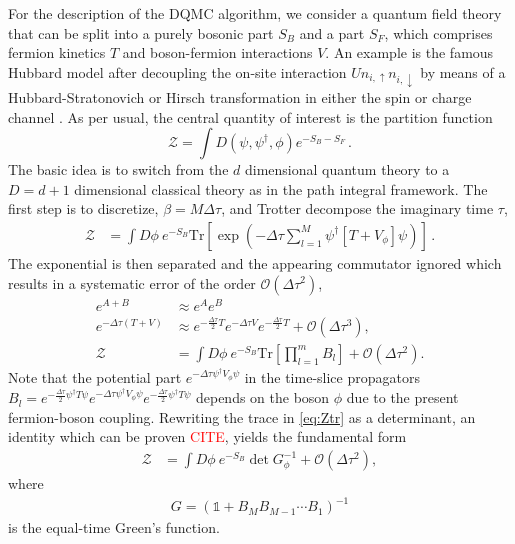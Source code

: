 \documentclass[%
 reprint,
superscriptaddress,
showpacs,
 amsmath,amssymb,
 aps,
 prb,
longbibliography,
]{revtex4-1}
\begin{document}
For the description of the DQMC algorithm\cite{Blankenbecler1981}, we consider a quantum field theory that can be split into a purely bosonic part $S_B$ and a part $S_F$, which comprises fermion kinetics $T$ and boson-fermion interactions $V$. An example is the famous Hubbard model after decoupling the on-site
interaction $U n_{i, \uparrow} n_{i, \downarrow}$ by means of a Hubbard-Stratonovich or Hirsch transformation in either the spin or charge channel \cite{Hirsch1983}. As per usual, the central quantity of interest is the partition function
%
\begin{equation}
\mathcal{Z} = \int D\left( \psi, \psi^\dagger, \phi \right) e^{-S_B - S_F} \,.
\end{equation}
%
The basic idea is to switch from the $d$ dimensional quantum theory to a $D = d + 1$ dimensional classical theory as in the path integral framework. The first step is to discretize, $\beta = M \Delta \tau$, and Trotter decompose the imaginary time $\tau$,
%
\begin{align}
	\mathcal{Z} &= \int D\phi \ e^{-S_B} \mathrm{Tr}{\left[\exp{\left( -\Delta\tau \sum_{l=1}^M \psi^\dagger \left[T + V_\phi\right] \psi \right)}\right]} \label{eq:discretizedpi} \,.
\end{align}
%
The exponential is then separated and the appearing commutator ignored which results in a systematic error of the order $\mathcal{O}\left(\Delta\tau^2\right)$,
\begin{align}
	e^{A + B} &\approx e^A e^B \quad \nonumber\\
	e^{-\Delta\tau (T + V)} &\approx e^{- \frac{\Delta\tau}{2}T} e^{-\Delta\tau V} e^{- \frac{\Delta\tau}{2}T} + \mathcal{O}\left(\Delta\tau^3\right), \nonumber\\
	\mathcal{Z} &= \int D\phi \ e^{-S_B} \mathrm{Tr}{\left[ \prod_{l=1}^{m} B_l \right]} + \mathcal{O}\left(\Delta\tau^2\right). \label{eq:Ztr}
\end{align}
%
Note that the potential part $e^{-\Delta\tau \psi^\dagger V_\phi \psi}$ in the time-slice propagators $B_l = e^{- \frac{\Delta\tau}{2}\psi^\dagger T \psi} e^{-\Delta\tau \psi^\dagger V_\phi \psi} e^{- \frac{\Delta\tau}{2}\psi^\dagger T \psi}$ depends on the boson $\phi$ due to the present fermion-boson coupling. Rewriting the trace in \eqref{eq:Ztr} as a determinant, an identity which can be proven \textcolor{red}{CITE}, yields the fundamental form
%
\begin{align}
	\mathcal{Z} &= \int D\phi \ e^{-S_B} \det{G_\phi^{-1}} + \mathcal{O}\left(\Delta\tau^2\right), \label{eq:DQMC}
\end{align}
%
where
\begin{align}
	G = \left( \mathbb{1} + B_M B_{M-1} \cdots B_1 \right)^{-1} \label{etgf}
\end{align}
is the equal-time Green's function.
\end{document}
